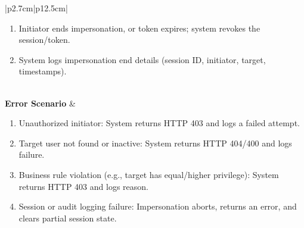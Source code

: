\begin{table}[H]
\begin{tabular}{|p{2.7cm}|p{12.5cm}|}
\begin{minipage}[t]{\linewidth}
\begin{enumerate}[topsep=0pt,itemsep=1pt,parsep=0pt,partopsep=0pt]
                                          \item Initiator ends impersonation, or token expires; system revokes the session/token.
                                          \item System logs impersonation end details (session ID, initiator, target, timestamps).
                                      \end{enumerate}
                                  \end{minipage} \\\hline
        \textbf{Error Scenario} & \begin{minipage}[t]{\linewidth}
                                      \begin{enumerate}[topsep=0pt,itemsep=1pt,parsep=0pt,partopsep=0pt]
                                          \item Unauthorized initiator: System returns HTTP 403 and logs a failed attempt.
                                          \item Target user not found or inactive: System returns HTTP 404/400 and logs failure.
                                          \item Business rule violation (e.g., target has equal/higher privilege): System returns HTTP 403 and logs reason.
                                          \item Session or audit logging failure: Impersonation aborts, returns an error, and clears partial session state.
                                      \end{enumerate}
                                  \end{minipage} \\\hline
    \end{tabular}
    \label{tab:admin-impersonate-user}
\end{table}

